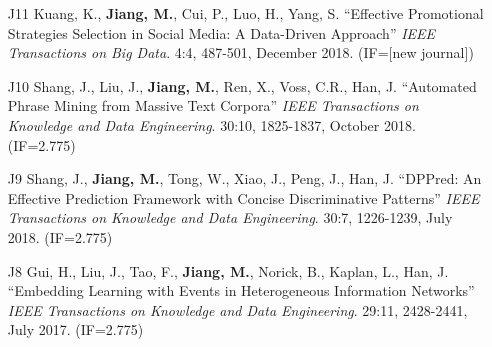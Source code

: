 \documentclass[10pt]{article}
\newenvironment{myindentpar}[1]%
{\begin{list}{}%
         {\setlength{\leftmargin}{#1}}%
         \item[]%
}
{\end{list}}
\newcounter{list}
\begin{document}
\begin{myindentpar}{0.00cm}
\begin{enumerate}[leftmargin=.5cm]
\item[J11] Kuang, K., \textbf{Jiang, M.}, Cui, P., Luo, H., Yang, S. ``Effective Promotional Strategies Selection in Social Media: A Data-Driven Approach'' \textit{IEEE Transactions on Big Data}. 4:4, 487-501, December 2018. (IF=[new journal])

\vspace{-0.1cm}

\item[J10] Shang, J., Liu, J., \textbf{Jiang, M.}, Ren, X., Voss, C.R., Han, J. ``Automated Phrase Mining from Massive Text Corpora'' \textit{IEEE Transactions on Knowledge and Data Engineering}. 30:10, 1825-1837, October 2018. (IF=2.775)

\vspace{-0.1cm}

\item[J9] Shang, J., \textbf{Jiang, M.}, Tong, W., Xiao, J., Peng, J., Han, J. ``DPPred: An Effective Prediction Framework with Concise Discriminative Patterns'' \textit{IEEE Transactions on Knowledge and Data Engineering}. 30:7, 1226-1239, July 2018. (IF=2.775)

\vspace{-0.1cm}

\item[J8] Gui, H., Liu, J., Tao, F., \textbf{Jiang, M.}, Norick, B., Kaplan, L., Han, J. ``Embedding Learning with Events in Heterogeneous Information Networks'' \textit{IEEE Transactions on Knowledge and Data Engineering}. 29:11, 2428-2441, July 2017. (IF=2.775)

\vspace{-0.1cm}


\end{enumerate}
\end{myindentpar}
\end{document}
